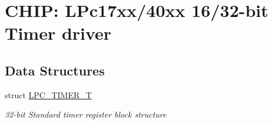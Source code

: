 \hypertarget{group__TIMER__17XX__40XX}{\section{C\-H\-I\-P\-: L\-Pc17xx/40xx 16/32-\/bit Timer driver}
\label{group__TIMER__17XX__40XX}
}
\subsection*{Data Structures}
\begin{DoxyCompactItemize}
\item 
struct \hyperlink{structLPC__TIMER__T}{L\-P\-C\-\_\-\-T\-I\-M\-E\-R\-\_\-\-T}
\begin{DoxyCompactList}\small\item\em 32-\/bit Standard timer register block structure \end{DoxyCompactList}\end{DoxyCompactItemize}
